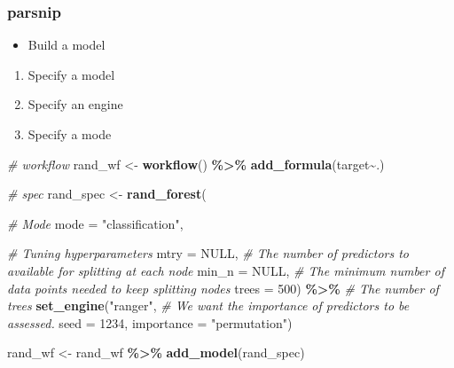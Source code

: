 \documentclass[
]{book}
\newenvironment{Shaded}{\begin{snugshade}}{\end{snugshade}}
\newcommand{\CommentTok}[1]{\textcolor[rgb]{0.56,0.35,0.01}{\textit{#1}}}
\newcommand{\DataTypeTok}[1]{\textcolor[rgb]{0.13,0.29,0.53}{#1}}
\newcommand{\DecValTok}[1]{\textcolor[rgb]{0.00,0.00,0.81}{#1}}
\newcommand{\KeywordTok}[1]{\textcolor[rgb]{0.13,0.29,0.53}{\textbf{#1}}}
\newcommand{\NormalTok}[1]{#1}
\newcommand{\OperatorTok}[1]{\textcolor[rgb]{0.81,0.36,0.00}{\textbf{#1}}}
\newcommand{\OtherTok}[1]{\textcolor[rgb]{0.56,0.35,0.01}{#1}}
\newcommand{\StringTok}[1]{\textcolor[rgb]{0.31,0.60,0.02}{#1}}
\providecommand{\tightlist}{%
  \setlength{\itemsep}{0pt}\setlength{\parskip}{0pt}}
\begin{document}
\hypertarget{parsnip-2}{%
\subsubsection{parsnip}\label{parsnip-2}}

\begin{itemize}
\tightlist
\item
  Build a model
\end{itemize}

\begin{enumerate}
\def\labelenumi{\arabic{enumi}.}
\tightlist
\item
  Specify a model
\item
  Specify an engine
\item
  Specify a mode
\end{enumerate}

\begin{Shaded}
\begin{Highlighting}[]
\CommentTok{\# workflow }
\NormalTok{rand\_wf \textless{}{-}}\StringTok{ }\KeywordTok{workflow}\NormalTok{() }\OperatorTok{\%\textgreater{}\%}\StringTok{ }\KeywordTok{add\_formula}\NormalTok{(target}\OperatorTok{\textasciitilde{}}\NormalTok{.)}

\CommentTok{\# spec }
\NormalTok{rand\_spec \textless{}{-}}\StringTok{ }\KeywordTok{rand\_forest}\NormalTok{(}
  
           \CommentTok{\# Mode }
           \DataTypeTok{mode =} \StringTok{"classification"}\NormalTok{,}
           
           \CommentTok{\# Tuning hyperparameters}
           \DataTypeTok{mtry =} \OtherTok{NULL}\NormalTok{, }\CommentTok{\# The number of predictors to available for splitting at each node  }
           \DataTypeTok{min\_n =} \OtherTok{NULL}\NormalTok{, }\CommentTok{\# The minimum number of data points needed to keep splitting nodes}
           \DataTypeTok{trees =} \DecValTok{500}\NormalTok{) }\OperatorTok{\%\textgreater{}\%}\StringTok{ }\CommentTok{\# The number of trees}
\StringTok{  }\KeywordTok{set\_engine}\NormalTok{(}\StringTok{"ranger"}\NormalTok{, }
             \CommentTok{\# We want the importance of predictors to be assessed.}
             \DataTypeTok{seed =} \DecValTok{1234}\NormalTok{, }
             \DataTypeTok{importance =} \StringTok{"permutation"}\NormalTok{) }

\NormalTok{rand\_wf \textless{}{-}}\StringTok{ }\NormalTok{rand\_wf }\OperatorTok{\%\textgreater{}\%}\StringTok{ }\KeywordTok{add\_model}\NormalTok{(rand\_spec)}
\end{Highlighting}
\end{Shaded}
\end{document}
